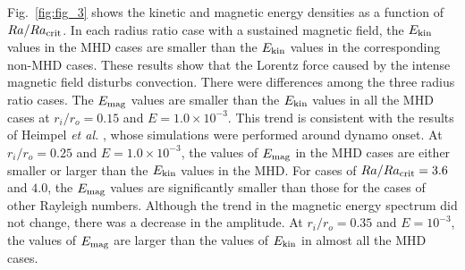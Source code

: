 {\color{red} %
Fig.~\ref{fig:fig_3} shows the kinetic and magnetic energy densities as a function of $Ra / Ra_{\rm crit}$.
}
In each radius ratio case with a sustained magnetic field, the $E_{\rm kin}$ values in the MHD cases are smaller than the $E_{\rm kin}$ values in the corresponding non-MHD cases. 
These results show that the Lorentz force caused by the intense magnetic field disturbs convection.
There were differences among the three radius ratio cases. 
{\color{red} %
The $E_{\rm mag}$ values are smaller than the $E_{\rm kin}$ values in all the MHD cases at $r_i / r_o = 0.15$
}
{\color{blue}  %
and $E = 1.0 \times 10^{-3}$.
}
This trend is consistent with the results of Heimpel {\it et al.} , whose simulations were performed around dynamo onset. 
At $r_i/r_o = 0.25$ and $E = 1.0 \times 10^{-3}$, the values of $E_{\rm mag}$ in the MHD cases are either smaller or larger than the $E_{\rm kin}$ values in the MHD.
For cases of $Ra/Ra_{\rm crit}  = 3.6$ and $4.0$, the $E_{\rm mag}$ values are significantly smaller than those for the cases of other Rayleigh numbers.
Although the trend in the magnetic energy spectrum did not change, there was a decrease in the amplitude.
{\color{blue} At $r_i/r_o = 0.35$ and $E = 10^{-3}$, 
}
{\color{red}
the values of $E_{\rm mag}$ are larger than the values of $E_{\rm kin}$ in almost all the MHD cases.
}

